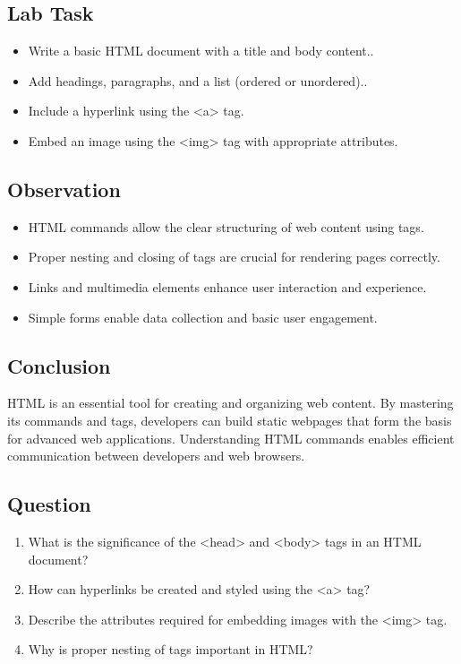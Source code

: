 \documentclass[a4paper,9pt]{article}
\begin{document}
\begin{enumerate}
\end{enumerate}

\subsection{Lab Task}

\begin{itemize}
	\item Write a basic HTML document with a title and body content..
	\item Add headings, paragraphs, and a list (ordered or unordered)..
	\item Include a hyperlink using the <a> tag.
	\item Embed an image using the <img> tag with appropriate attributes.
\end{itemize}

\subsection{Observation}
\begin{itemize}
	\item HTML commands allow the clear structuring of web content using tags.
	
	
	\item Proper nesting and closing of tags are crucial for rendering pages correctly.
	\item Links and multimedia elements enhance user interaction and experience.
	\item Simple forms enable data collection and basic user engagement.
\end{itemize}
\subsection{Conclusion}
HTML is an essential tool for creating and organizing web content. By mastering its commands and tags, developers can build static webpages that form the basis for advanced web applications. Understanding HTML commands enables efficient communication between developers and web browsers.

\subsection{Question}

\begin{enumerate}
	\item What is the significance of the <head> and <body> tags in an HTML document?
	
	\item How can hyperlinks be created and styled using the <a> tag?
	\item Describe the attributes required for embedding images with the <img> tag.
	\item Why is proper nesting of tags important in HTML?
	
\end{enumerate}
\end{document}
